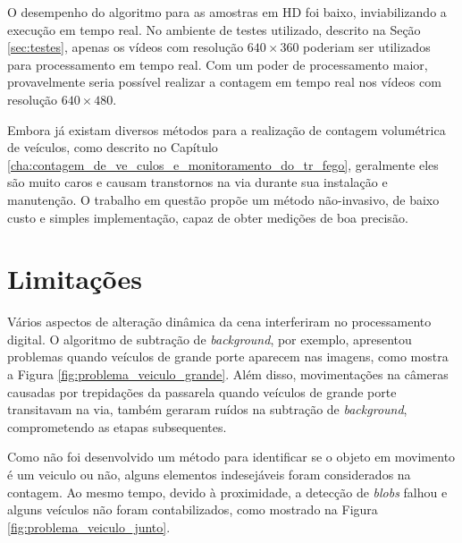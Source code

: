 

O desempenho do algoritmo para as amostras em HD foi baixo, inviabilizando a execução em tempo real. No ambiente de testes utilizado, descrito na Seção \ref{sec:testes}, apenas os vídeos com resolução $640\times 360$ poderiam ser utilizados para processamento em tempo real. Com um poder de processamento maior, provavelmente seria possível realizar a contagem em tempo real nos vídeos com resolução $640\times 480$.

Embora já existam diversos métodos para a realização de contagem volumétrica de veículos, como descrito no Capítulo \ref{cha:contagem_de_ve_culos_e_monitoramento_do_tr_fego}, geralmente eles são muito caros e causam transtornos na via durante sua instalação e manutenção. O trabalho em questão propõe um método não-invasivo, de baixo custo e simples implementação, capaz de obter medições de boa precisão.

\section{Limitações} %
\label{sec:pontos_negativos_do_m_todo}

Vários aspectos de alteração dinâmica da cena interferiram no processamento digital. O algoritmo de subtração de \textit{background}, por exemplo, apresentou problemas quando veículos de grande porte aparecem nas imagens, como mostra a Figura \ref{fig:problema_veiculo_grande}. Além disso, movimentações na câmeras causadas por trepidações da passarela quando veículos de grande porte transitavam na via, também geraram ruídos na subtração de \textit{background}, comprometendo as etapas subsequentes.

Como não foi desenvolvido um método para identificar se o objeto em movimento é um veiculo ou não, alguns elementos indesejáveis foram considerados na contagem. Ao mesmo tempo, devido à proximidade, a detecção de \textit{blobs} falhou e alguns veículos não foram contabilizados, como mostrado na Figura \ref{fig:problema_veiculo_junto}.

